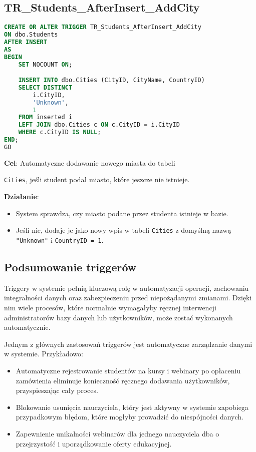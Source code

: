 \documentclass[12pt]{article}
\begin{document}
\subsection{TR\_Students\_AfterInsert\_AddCity}
\begin{lstlisting}[language=SQL]
CREATE OR ALTER TRIGGER TR_Students_AfterInsert_AddCity
ON dbo.Students
AFTER INSERT
AS
BEGIN
    SET NOCOUNT ON;

    INSERT INTO dbo.Cities (CityID, CityName, CountryID)
    SELECT DISTINCT
        i.CityID,
        'Unknown',  
        1           
    FROM inserted i
    LEFT JOIN dbo.Cities c ON c.CityID = i.CityID
    WHERE c.CityID IS NULL;
END;
GO
\end{lstlisting}

\noindent \textbf{Cel}: Automatyczne dodawanie nowego miasta do tabeli 

\noindent \texttt{Cities}, jeśli student podał miasto, które jeszcze nie istnieje.  

\noindent \textbf{Działanie}:  
\begin{itemize}
    \item System sprawdza, czy miasto podane przez studenta istnieje w bazie.
    \item Jeśli nie, dodaje je jako nowy wpis w tabeli \texttt{Cities} z domyślną nazwą \texttt{"Unknown"} i \texttt{CountryID = 1}.
\end{itemize}

\vspace{1em}

\subsection*{Podsumowanie triggerów}
\vspace{1em}

\noindent Triggery w systemie pełnią kluczową rolę w automatyzacji operacji, zachowaniu integralności danych oraz zabezpieczeniu przed niepożądanymi zmianami. Dzięki nim wiele procesów, które normalnie wymagałyby ręcznej interwencji administratorów bazy danych lub użytkowników, może zostać wykonanych automatycznie.

\noindent Jednym z głównych zastosowań triggerów jest automatyczne zarządzanie danymi w systemie. Przykładowo:
\begin{itemize}
    \item Automatyczne rejestrowanie studentów na kursy i webinary po opłaceniu zamówienia eliminuje konieczność ręcznego dodawania użytkowników, przyspieszając cały proces.
    \item Blokowanie usunięcia nauczyciela, który jest aktywny w systemie zapobiega przypadkowym błędom, które mogłyby prowadzić do niespójności danych.
    \item Zapewnienie unikalności webinarów dla jednego nauczyciela dba o przejrzystość i uporządkowanie oferty edukacyjnej.
\end{itemize}
\end{document}
